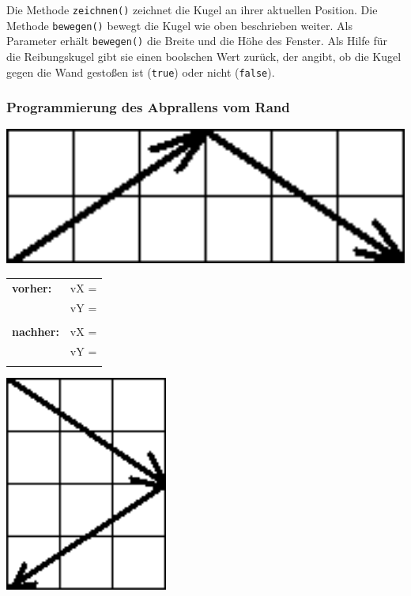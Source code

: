 Die Methode \verb|zeichnen()| zeichnet die Kugel an ihrer aktuellen Position.
Die Methode \verb|bewegen()| bewegt die Kugel wie oben beschrieben weiter. Als
Parameter erhält \verb|bewegen()| die Breite und die Höhe des Fenster. Als Hilfe
für die Reibungskugel gibt sie einen boolschen Wert zurück, der angibt, ob die
Kugel gegen die Wand gestoßen ist (\verb|true|) oder nicht (\verb|false|).

\subsubsection{Programmierung des Abprallens vom Rand}

\begin{minipage}{0.15\textwidth}
\includegraphics[width=1.0\textwidth]{./inf/SEKII/16_Java_Vererbung/abprallen_oben.png}
\end{minipage}
\hfill
\begin{minipage}{0.2\textwidth}
\begin{tabular}{ll}
\textbf{vorher:}  & vX = \\
                  & vY = \\
                  &      \\
\textbf{nachher:} & vX = \\
                  & vY = \\
                  &      \\
\end{tabular}
\end{minipage}
\hfill
\begin{minipage}{0.2\textwidth}
\includegraphics[width=0.4\textwidth]{./inf/SEKII/16_Java_Vererbung/abprallen_seite.png}
\end{minipage}

